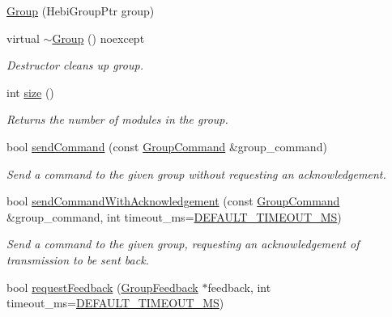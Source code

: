 \begin{DoxyCompactItemize}
\item 
\hyperlink{classhebi_1_1Group_a52041e4d07d6d0767c52bb896d125e84}{Group} (Hebi\+Group\+Ptr group)
\item 
\mbox{\label{classhebi_1_1Group_affa9e3421af94d40a670112e53acaa1d}} 
virtual \hyperlink{classhebi_1_1Group_affa9e3421af94d40a670112e53acaa1d}{$\sim$\+Group} () noexcept
\begin{DoxyCompactList}\small\item\em Destructor cleans up group. \end{DoxyCompactList}\item 
\mbox{\label{classhebi_1_1Group_a3cc170c50e51cfc25bc73ae5680bd115}} 
int \hyperlink{classhebi_1_1Group_a3cc170c50e51cfc25bc73ae5680bd115}{size} ()
\begin{DoxyCompactList}\small\item\em Returns the number of modules in the group. \end{DoxyCompactList}\item 
bool \hyperlink{classhebi_1_1Group_a3645f8c1019e6949dc64fbdec7f73442}{send\+Command} (const \hyperlink{classhebi_1_1GroupCommand}{Group\+Command} \&group\+\_\+command)
\begin{DoxyCompactList}\small\item\em Send a command to the given group without requesting an acknowledgement. \end{DoxyCompactList}\item 
bool \hyperlink{classhebi_1_1Group_a992aad2873e2d108c2d4deb3f824a538}{send\+Command\+With\+Acknowledgement} (const \hyperlink{classhebi_1_1GroupCommand}{Group\+Command} \&group\+\_\+command, int timeout\+\_\+ms=\hyperlink{classhebi_1_1Group_a3d01ca6dbd28ec984cda196a77056dd4}{D\+E\+F\+A\+U\+L\+T\+\_\+\+T\+I\+M\+E\+O\+U\+T\+\_\+\+MS})
\begin{DoxyCompactList}\small\item\em Send a command to the given group, requesting an acknowledgement of transmission to be sent back. \end{DoxyCompactList}\item 
bool \hyperlink{classhebi_1_1Group_a191170df8c2b64e039063e89449b4587}{request\+Feedback} (\hyperlink{classhebi_1_1GroupFeedback}{Group\+Feedback} $\ast$feedback, int timeout\+\_\+ms=\hyperlink{classhebi_1_1Group_a3d01ca6dbd28ec984cda196a77056dd4}{D\+E\+F\+A\+U\+L\+T\+\_\+\+T\+I\+M\+E\+O\+U\+T\+\_\+\+MS})

\end{DoxyCompactItemize}
